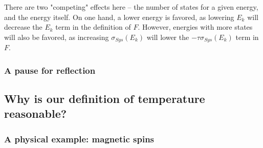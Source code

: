 \documentclass{paper}
\begin{document}
\par There are two "competing" effects here -- the number of states for a given energy, and the energy itself.  On one hand, a lower energy is favored, as lowering $E_k$ will decrease the $E_k$ term in the definition of $F$.  However, energies with more states will also be favored, as increasing $\sigma_{Sys}(E_k)$ will lower the $-\tau \sigma_{Sys}(E_k)$ term in $F$.
    
\subsubsection{A pause for reflection}

\subsection{Why is our definition of temperature reasonable?}
\subsubsection{A physical example: magnetic spins}

    
\end{document}
